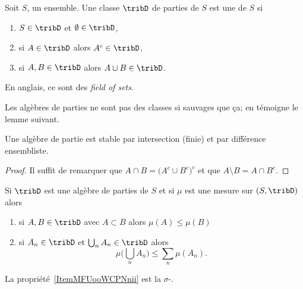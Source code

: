 \begin{definition}   \label{DefTCUoogGDud}
	Soit \( S\), un ensemble. Une classe \( \tribD\) de parties de \( S\) est une  de \( S\) si
	\begin{enumerate}
		\item
		      \( S\in\tribD\) et \( \emptyset\in\tribD\),
		\item
		      si \( A\in\tribD\) alors \( A^c\in\tribD\),
		\item
		      si \( A,B\in\tribD\) alors \( A\cup B\in\tribD\).
	\end{enumerate}
\end{definition}

\begin{normaltext}
    En anglais, ce sont des \emph{field of sets}\cite{BIBooNBGPooSPkEKX}.
\end{normaltext}

Les algèbres de parties ne sont pas des classes si sauvages que ça; en témoigne le lemme suivant.
\begin{lemma}   \label{LemBFKootqXKl}
	Une algèbre de partie est stable par intersection (finie) et par différence ensembliste.
\end{lemma}

\begin{proof}
	Il suffit de remarquer que \( A\cap B=\big( A^c\cup B^c \big)^c\) et que \( A\setminus B=A\cap B^c\).
\end{proof}

\begin{lemma}  \label{LemZQUooMdCpq}
	Si \( \tribD\) est une algèbre de parties de \( S\) et si \( \mu\) est une mesure sur \( (S,\tribD)\) alors
	\begin{enumerate}
		\item
		      si \( A,B\in\tribD\) avec \( A\subset B\) alors \( \mu(A)\leq \mu(B)\)
		\item   \label{ItemMFUooWCPNnii}
		      si \( A_n\in\tribD\) et \( \bigcup_nA_n\in\tribD\) alors
		      \begin{equation}
			      \mu\big( \bigcup_nA_n \big)\leq\sum_n\mu(A_n).
		      \end{equation}
	\end{enumerate}
\end{lemma}
La propriété~\ref{ItemMFUooWCPNnii} est la \( \sigma\)-.

